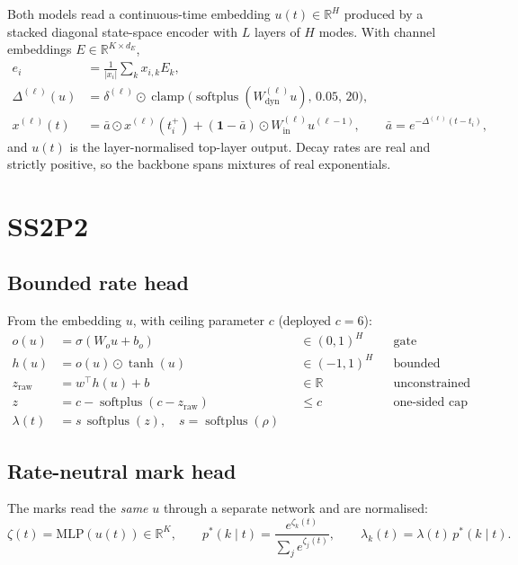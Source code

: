 \documentclass[11pt]{article}
\theoremstyle{remark}
\newcommand{\R}{\mathbb{R}}
\newcommand{\softplus}{\operatorname{softplus}}
\begin{document}
Both models read a continuous-time embedding $u(t) \in \R^H$ produced by a
stacked diagonal state-space encoder with $L$ layers of $H$ modes. With channel
embeddings $E \in \R^{K \times d_E}$,
\begin{align}
e_i &= \frac{1}{|x_i|}\sum_{k} x_{i,k} E_k, \\
\Delta^{(\ell)}(u) &= \delta^{(\ell)} \odot
  \operatorname{clamp}\!\big(\softplus(W^{(\ell)}_{\mathrm{dyn}} u),\, 0.05,\, 20\big), \\
x^{(\ell)}(t) &= \bar a \odot x^{(\ell)}(t_i^+)
  + (\mathbf 1 - \bar a) \odot W^{(\ell)}_{\mathrm{in}} u^{(\ell-1)},
  \qquad \bar a = e^{-\Delta^{(\ell)}(t - t_i)} ,
\end{align}
and $u(t)$ is the layer-normalised top-layer output. Decay rates are real and
strictly positive, so the backbone spans mixtures of real exponentials.

\section{SS2P2}

\subsection{Bounded rate head}

From the embedding $u$, with ceiling parameter $c$ (deployed $c = 6$):
\begin{equation}
\boxed{
\begin{aligned}
o(u)     &= \sigma(W_o u + b_o) && \in (0,1)^H && \text{gate}\\
h(u)     &= o(u) \odot \tanh(u) && \in (-1,1)^H && \text{bounded state}\\
z_{\mathrm{raw}} &= w^{\!\top} h(u) + b && \in \R && \text{unconstrained}\\
z        &= c - \softplus(c - z_{\mathrm{raw}}) && \le c && \text{one-sided cap}\\
\lambda(t) &= s\,\softplus(z), \quad s = \softplus(\rho) && &&
\end{aligned}}
\label{eq:ss2p2rate}
\end{equation}

\subsection{Rate-neutral mark head}

The marks read the \emph{same} $u$ through a separate network and are
normalised:
\begin{equation}
\zeta(t) = \mathrm{MLP}(u(t)) \in \R^K, \qquad
p^*(k \mid t) = \frac{e^{\zeta_k(t)}}{\sum_j e^{\zeta_j(t)}}, \qquad
\lambda_k(t) = \lambda(t)\, p^*(k \mid t).
\label{eq:ss2p2mark}
\end{equation}
\end{document}
